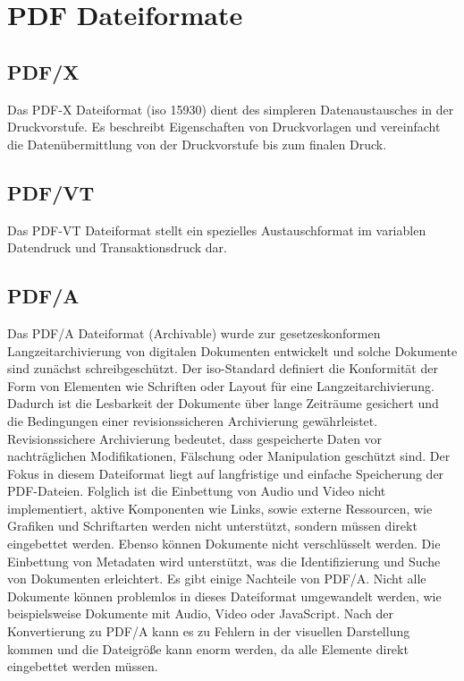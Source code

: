 \section{PDF Dateiformate}


\subsection{PDF/X}
Das PDF-X Dateiformat (\gls{iso} 15930) dient des simpleren Datenaustausches in der Druckvorstufe. Es beschreibt Eigenschaften von Druckvorlagen und vereinfacht die Datenübermittlung von der Druckvorstufe bis zum finalen Druck.


\subsection{PDF/VT}
Das PDF-VT Dateiformat stellt ein spezielles Austauschformat im variablen Datendruck und Transaktionsdruck dar.


\subsection{PDF/A}
Das PDF/A Dateiformat (Archivable) wurde zur gesetzeskonformen Langzeitarchivierung von digitalen Dokumenten entwickelt und solche Dokumente sind zunächst schreibgeschützt. Der \gls{iso}-Standard definiert die Konformität der Form von Elementen wie Schriften oder Layout für eine Langzeitarchivierung. Dadurch ist die Lesbarkeit der Dokumente über lange Zeiträume gesichert und die Bedingungen einer revisionssicheren Archivierung gewährleistet. \cite{adobe-pdf-a} Revisionssichere Archivierung bedeutet, dass gespeicherte Daten vor nachträglichen Modifikationen, Fälschung oder Manipulation geschützt sind. \cite{adobe-revisions} Der Fokus in diesem Dateiformat liegt auf langfristige und einfache Speicherung der PDF-Dateien. Folglich ist die Einbettung von Audio und Video nicht implementiert, aktive Komponenten wie Links, sowie externe Ressourcen, wie Grafiken und Schriftarten werden nicht unterstützt, sondern müssen direkt eingebettet werden. Ebenso können Dokumente nicht verschlüsselt werden. Die Einbettung von Metadaten wird unterstützt, was die Identifizierung und Suche von Dokumenten erleichtert. Es gibt einige Nachteile von PDF/A. Nicht alle Dokumente können problemlos in dieses Dateiformat umgewandelt werden, wie beispielsweise Dokumente mit Audio, Video oder JavaScript. Nach der Konvertierung zu PDF/A kann es zu Fehlern in der visuellen Darstellung kommen und die Dateigröße kann enorm werden, da alle Elemente direkt eingebettet werden müssen. \cite{adobe-pdf-a}

